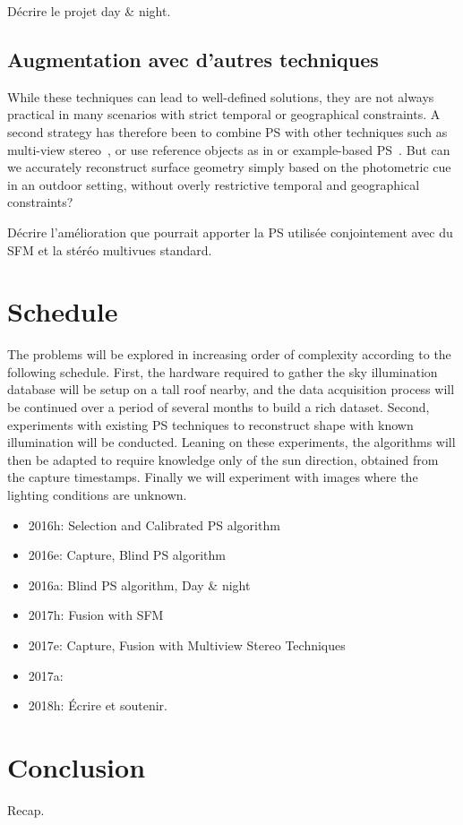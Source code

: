 \documentclass{report}
\begin{document}
Décrire le projet day \& night.

\section{Augmentation avec d'autres techniques}

While these techniques can lead to well-defined solutions, they are not always practical in many scenarios with strict temporal or geographical constraints. A second strategy has therefore been to combine PS with other techniques such as multi-view stereo~\cite{inose-tcva-13,shi-3dv-14}, or use reference objects as in \cite{johnson-cvpr-11} or example-based PS~\cite{hertzmann-pami-05,ackermann-3dv-14}. But can we accurately reconstruct surface geometry simply based on the photometric cue in an outdoor setting, without overly restrictive temporal and geographical constraints?

Décrire l'amélioration que pourrait apporter la PS utilisée conjointement avec du SFM et la stéréo multivues standard.


\chapter{Schedule}

The problems will be explored in increasing order of complexity according to the following schedule. First, the hardware required to gather the sky illumination database will be setup on a tall roof nearby, and the data acquisition process will be continued over a period of several months to build a rich dataset. Second, experiments with existing PS techniques to reconstruct shape with known illumination will be conducted. Leaning on these experiments, the algorithms will then be adapted to require knowledge only of the sun direction, obtained from the capture timestamps. Finally we will experiment with images where the lighting conditions are unknown.

\begin{itemize}
	\item 2016h: Selection and Calibrated PS algorithm
	\item 2016e: Capture, Blind PS algorithm
	\item 2016a: Blind PS algorithm, Day \& night
	\item 2017h: Fusion with SFM
	\item 2017e: Capture, Fusion with Multiview Stereo Techniques
	\item 2017a:
	\item 2018h: Écrire et soutenir.
\end{itemize}


\chapter{Conclusion}\label{conclusion}

Recap.

{\small


}
\end{document}
